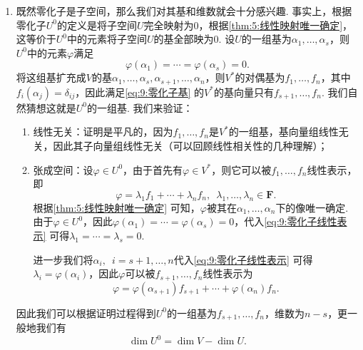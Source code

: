 \begin{enumerate}
\begin{enumerate}
              \item 既然零化子是子空间，那么我们对其基和维数就会十分感兴趣. 事实上，根据零化子$U^0$的定义是将子空间$U$完全映射为0，根据\autoref{thm:5:线性映射唯一确定}，这等价于$U^0$中的元素将子空间$U$的基全部映为0. 设$U$的一组基为$\alpha_1,\ldots,\alpha_s$，则$U^0$中的元素$\varphi$满足
                    \begin{equation}\label{eq:9:零化子基}
                        \varphi(\alpha_1)=\cdots=\varphi(\alpha_s)=0.
                    \end{equation}
                    将这组基扩充成$V$的基$\alpha_1,\ldots,\alpha_s,\alpha_{s+1},\ldots,\alpha_n$，则$V^*$的对偶基为$f_1,\ldots,f_n$，其中$f_i(\alpha_j)=\delta_{ij}$，因此满足\autoref{eq:9:零化子基} 的$V^*$的基向量只有$f_{s+1},\ldots,f_n$. 我们自然猜想这就是$U^0$的一组基. 我们来验证：
                    \begin{enumerate}
                        \item 线性无关：证明是平凡的，因为$f_1,\ldots,f_n$是$V^*$的一组基，基向量组线性无关，因此其子向量组线性无关（可以回顾线性相关性的几种理解）；

                        \item 张成空间：设$\varphi\in U^0$，由于首先有$\varphi\in V^*$，则它可以被$f_1,\ldots,f_n$线性表示，即
                              \begin{equation}\label{eq:9:零化子线性表示}
                                  \varphi=\lambda_1f_1+\cdots+\lambda_nf_n,\enspace \lambda_1,\ldots,\lambda_n\in\mathbf{F}.
                              \end{equation}
                              根据\autoref{thm:5:线性映射唯一确定} 可知，$\varphi$被其在$\alpha_1,\ldots,\alpha_n$下的像唯一确定. 由于$\varphi\in U^0$，因此$\varphi(\alpha_1)=\cdots=\varphi(\alpha_s)=0$，代入\autoref{eq:9:零化子线性表示} 可得$\lambda_1=\cdots=\lambda_s=0$.

                              进一步我们将$\alpha_{i},\enspace i=s+1,\ldots,n$代入\autoref{eq:9:零化子线性表示} 可得$\lambda_{i}=\varphi(\alpha_i)$，因此$\varphi$可以被$f_{s+1},\ldots,f_n$线性表示为
                              \[\varphi=\varphi(\alpha_{s+1})f_{s+1}+\cdots+\varphi(\alpha_n)f_n.\]
                    \end{enumerate}
                    因此我们可以根据证明过程得到$U^0$的一组基为$f_{s+1},\ldots,f_n$，维数为$n-s$，更一般地我们有
                    \[\dim U^0=\dim V-\dim U.\]
          \end{enumerate}


\end{enumerate}
